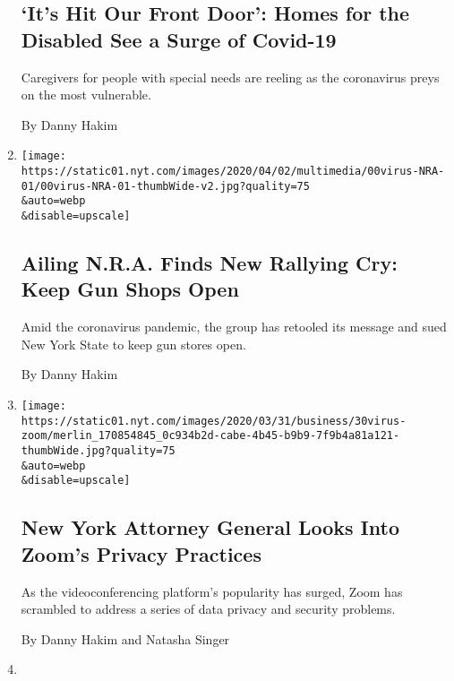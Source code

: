 \begin{enumerate}
  \hypertarget{its-hit-our-front-door-homes-for-the-disabled-see-a-surge-of-covid-19}{%
  \subsection{`It's Hit Our Front Door': Homes for the Disabled See a
  Surge of
  Covid-19}\label{its-hit-our-front-door-homes-for-the-disabled-see-a-surge-of-covid-19}}

  Caregivers for people with special needs are reeling as the
  coronavirus preys on the most vulnerable.

  By Danny Hakim
\item
  \href{/2020/04/02/us/nra-guns-coronavirus.html}{}

  \texttt{[image: https://static01.nyt.com/images/2020/04/02/multimedia/00virus-NRA-01/00virus-NRA-01-thumbWide-v2.jpg?quality=75\\\&auto=webp\\\&disable=upscale]}

  \hypertarget{ailing-nra-finds-new-rallying-cry-keep-gun-shops-open}{%
  \subsection{Ailing N.R.A. Finds New Rallying Cry: Keep Gun Shops
  Open}\label{ailing-nra-finds-new-rallying-cry-keep-gun-shops-open}}

  Amid the coronavirus pandemic, the group has retooled its message and
  sued New York State to keep gun stores open.

  By Danny Hakim
\item
  \href{/2020/03/30/technology/new-york-attorney-general-zoom-privacy.html}{}

  \texttt{[image: https://static01.nyt.com/images/2020/03/31/business/30virus-zoom/merlin\_170854845\_0c934b2d-cabe-4b45-b9b9-7f9b4a81a121-thumbWide.jpg?quality=75\\\&auto=webp\\\&disable=upscale]}

  \hypertarget{new-york-attorney-general-looks-into-zooms-privacy-practices}{%
  \subsection{New York Attorney General Looks Into Zoom's Privacy
  Practices}\label{new-york-attorney-general-looks-into-zooms-privacy-practices}}

  As the videoconferencing platform's popularity has surged, Zoom has
  scrambled to address a series of data privacy and security problems.

  By Danny Hakim and Natasha Singer
\item
  \href{/2020/03/09/us/trump-campaign-brad-parscale.html}{}


\end{enumerate}
